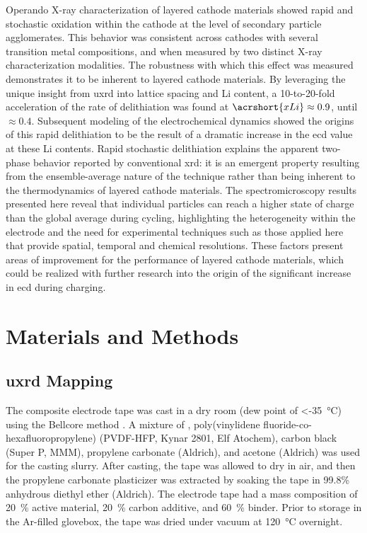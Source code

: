 \documentclass{article}
\begin{document}
Operando X-ray characterization of layered cathode materials showed
rapid and stochastic oxidation within the cathode at the level of
secondary particle agglomerates. This behavior was consistent across
cathodes with several transition metal compositions, and when measured
by two distinct X-ray characterization modalities. The robustness with
which this effect was measured demonstrates it to be inherent to
layered cathode materials. By leveraging the unique insight from
\gls{uxrd} into lattice spacing and Li content, a 10-to-20-fold
acceleration of the rate of delithiation was found at $\acrshort{xLi}
\approx 0.9$, until $\approx 0.4$. Subsequent modeling of the
electrochemical dynamics showed the origins of this rapid delithiation
to be the result of a dramatic increase in the \gls{ecd} value at
these Li contents. Rapid stochastic delithiation explains the apparent
two-phase behavior reported by conventional \gls{xrd}: it is an
emergent property resulting from the ensemble-average nature of the
technique rather than being inherent to the thermodynamics of layered
cathode materials. The spectromicroscopy results presented here reveal
that individual particles can reach a higher state of charge than the
global average during cycling, highlighting the heterogeneity within
the electrode and the need for experimental techniques such as those
applied here that provide spatial, temporal and chemical
resolutions. These factors present areas of improvement for the
performance of layered cathode materials, which could be realized with
further research into the origin of the significant increase in
\gls{ecd} during charging.

\section*{Materials and Methods}
\label{sec:methods}

\subsection*{\gls{uxrd} Mapping}

The \nca{} composite electrode tape was cast in a dry room (dew point
of \SI{<-35}{\celsius}) using the Bellcore method \cite{warren1996}. A
mixture of \nca{}, poly(vinylidene fluoride-co-hexafluoropropylene)
(PVDF-HFP, Kynar 2801, Elf Atochem), carbon black (Super P, MMM),
propylene carbonate (Aldrich), and acetone (Aldrich) was used for the
casting slurry. After casting, the tape was allowed to dry in air, and
then the propylene carbonate plasticizer was extracted by soaking the
tape in 99.8\% anhydrous diethyl ether (Aldrich). The electrode tape
had a mass composition of \SI{20}{\percent} active material,
\SI{20}{\percent} carbon additive, and \SI{60}{\percent} binder. Prior
to storage in the Ar-filled glovebox, the tape was dried under vacuum
at \SI{120}{\celsius} overnight.
\end{document}
